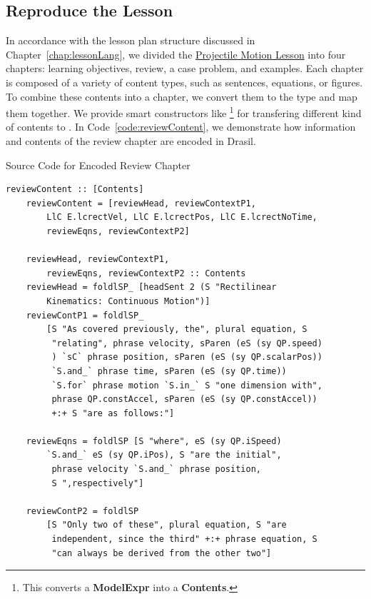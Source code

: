 \subsection{Reproduce the Lesson}
In accordance with the lesson plan structure discussed in 
Chapter~\ref{chap:lessonLang}, we divided the 
\href{https://github.com/smiths/caseStudies/blob/master/CaseStudies/projectile/projectileLesson/orgModeVersion/projMotLesson.pdf}{Projectile
 Motion Lesson} into four chapters: learning objectives, review, a case 
problem, and examples. Each chapter is composed of a variety of content types, 
such as sentences, equations, or figures. To combine these contents into a 
chapter, we convert them to the  type and map them together. 
We provide smart constructors like  \footnote{This converts a 
\textbf{ModelExpr} into a \textbf{Contents}.} for transfering different kind of 
contents to . In Code~\ref{code:reviewContent}, we 
demonstrate how information and contents of the review chapter are encoded in 
Drasil.

\begin{listing}[h!]
	\caption{Source Code for Encoded Review Chapter} 
	\label{code:reviewContent}
	\begin{lstlisting}[language=haskell1]	
	reviewContent :: [Contents]
	reviewContent = [reviewHead, reviewContextP1, 
		LlC E.lcrectVel, LlC E.lcrectPos, LlC E.lcrectNoTime, 
		reviewEqns, reviewContextP2]
		
	reviewHead, reviewContextP1, 
		reviewEqns, reviewContextP2 :: Contents
	reviewHead = foldlSP_ [headSent 2 (S "Rectilinear 
		Kinematics: Continuous Motion")]
	reviewContP1 = foldlSP_
		[S "As covered previously, the", plural equation, S 
	 	 "relating", phrase velocity, sParen (eS (sy QP.speed)
	 	 ) `sC` phrase position, sParen (eS (sy QP.scalarPos)) 
	 	 `S.and_` phrase time, sParen (eS (sy QP.time)) 
	 	 `S.for` phrase motion `S.in_` S "one dimension with",
	 	 phrase QP.constAccel, sParen (eS (sy QP.constAccel)) 
	 	 +:+ S "are as follows:"]
		
	reviewEqns = foldlSP [S "where", eS (sy QP.iSpeed) 
		`S.and_` eS (sy QP.iPos), S "are the initial",
		 phrase velocity `S.and_` phrase position, 
		 S ",respectively"]
		
	reviewContP2 = foldlSP 
		[S "Only two of these", plural equation, S "are 
	 	 independent, since the third" +:+ phrase equation, S 
	 	 "can always be derived from the other two"]
	\end{lstlisting}
\end{listing}

